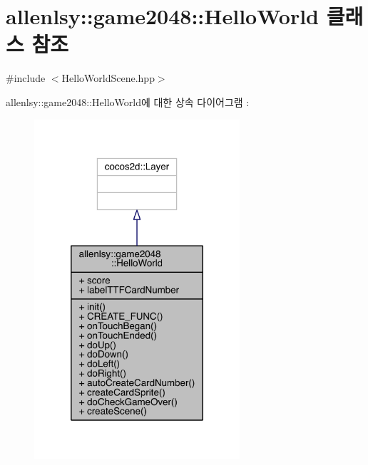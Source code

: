 \hypertarget{classallenlsy_1_1game2048_1_1_hello_world}{}\section{allenlsy\+:\+:game2048\+:\+:Hello\+World 클래스 참조}
\label{classallenlsy_1_1game2048_1_1_hello_world}


{\ttfamily \#include $<$Hello\+World\+Scene.\+hpp$>$}



allenlsy\+:\+:game2048\+:\+:Hello\+World에 대한 상속 다이어그램 \+: 
\nopagebreak
\begin{figure}[H]
\begin{center}
\leavevmode
\includegraphics[width=216pt]{classallenlsy_1_1game2048_1_1_hello_world__inherit__graph}
\end{center}
\end{figure}


